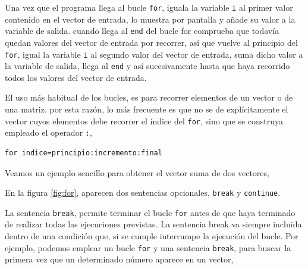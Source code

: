 Una vez que el programa llega al bucle \texttt{for}, iguala la variable \texttt{i} al primer valor contenido en el vector de entrada, lo muestra por pantalla y añade su valor a la variable de salida. cuando llega al \texttt{end} del bucle for comprueba que todavía quedan valores del vector de entrada por recorrer, así que vuelve al principio del \texttt{for}, igual la variable \texttt{i} al segundo valor del vector de entrada, suma dicho valor a la variable de salida, llega al \texttt{end} y así sucesivamente hasta que haya recorrido todos los valores del vector de entrada.

El uso más habitual de los bucles, es para recorrer elementos de un vector o de una matriz. por esta razón, lo más frecuente es que no se de explícitamente el vector cuyos elementos debe recorrer el índice del \texttt{for}, sino que se construya empleado el operador \texttt{:},
\begin{verbatim}
for indice=principio:incremento:final
\end{verbatim}

Veamos un ejemplo sencillo para obtener el vector suma de dos vectores,


En la figura \ref{fig:for}, aparecen dos sentencias opcionales, \texttt{break} y \texttt{continue}.

La sentencia \texttt{break}, permite terminar el bucle \texttt{for} antes de que haya terminado de realizar todas las ejecuciones previstas. La sentencia break va siempre incluida dentro de una condición que, si se cumple interrumpe la ejecución del bucle. Por ejemplo, podemos emplear un bucle \texttt{for} y una sentencia \texttt{break}, para buscar la primera vez que un determinado número aparece en un vector,


